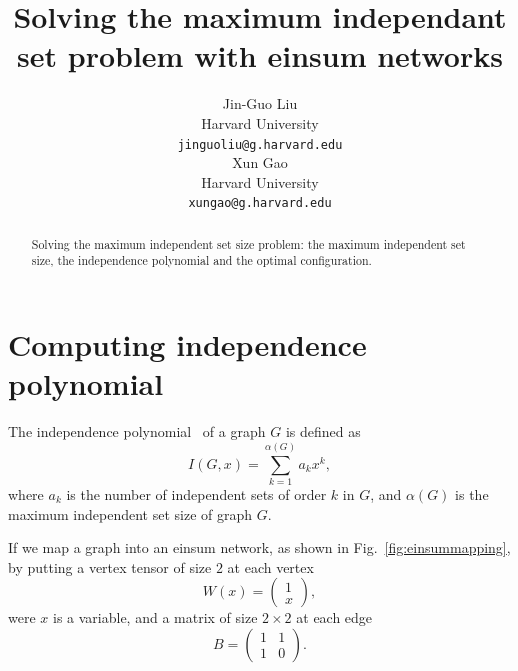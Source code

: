 \documentclass{article}
\newcommand{\<}{\langle}
\renewcommand{\>}{\rangle}
\renewcommand{\cite}[1]{{\citep{#1}}}
\newcommand{\Fig}[1]{Fig.~\ref{#1}}
\theoremstyle{definition}\newtheorem{definition}{\textit{Definition}}
\begin{document}
\title{Solving the maximum independant set problem with einsum networks}

\author{Jin-Guo Liu\\
Harvard University\\
\texttt{jinguoliu@g.harvard.edu}\\
\AND
Xun Gao\\
Harvard University\\
\texttt{xungao@g.harvard.edu}\\
}
\maketitle

\begin{abstract}
	Solving the maximum independent set size problem: the maximum independent set size, the independence polynomial and the optimal configuration.
\end{abstract}

\section{Computing independence polynomial}
The independence polynomial~\cite{Ferrin2014, Harvey2017} of a graph $G$ is defined as
\begin{equation}
I(G, x) = \sum_{k=1}^{\alpha(G)} a_k x^k,
\end{equation}
where $a_k$ is the number of independent sets of order $k$ in $G$, and $\alpha(G)$ is the maximum independent set size of graph $G$.

If we map a graph into an einsum network, as shown in \Fig{fig:einsummapping}, by putting a vertex tensor of size $2$ at each vertex
\begin{equation}
    W(x) = \left(\begin{matrix}
        1 \\
        x
    \end{matrix}\right),
\end{equation}
were $x$ is a variable, and a matrix of size $2 \times 2$ at each edge
\begin{equation}
    B = \left(\begin{matrix}
        1  & 1\\
        1 & 0
    \end{matrix}\right).
\end{equation}
\end{document}
